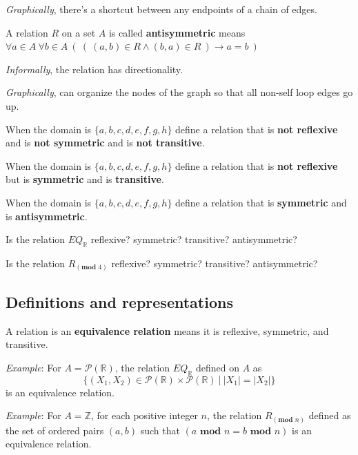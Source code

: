 \documentclass[12pt, oneside]{article}
\begin{document}
{\it Graphically}, there's a shortcut between any endpoints of a chain of 
edges. \vfill


A relation $R$ on a set $A$ is called {\bf antisymmetric} means 
$\forall a \in A ~\forall b \in A~\left(~\left( ~(a,b) \in R \land (b,a) \in R ~\right) \to a=b~\right)$
 

{\it Informally}, the relation has directionality.

{\it Graphically}, can organize the nodes of the graph so that 
all non-self loop edges go up. \vfill
\newpage



When the domain is $\{ a,b,c,d,e,f,g,h\}$ define a relation that is {\bf not reflexive} and 
is {\bf not symmetric} and is {\bf not transitive}.

\vfill

When the domain is $\{ a,b,c,d,e,f,g,h\}$ define a relation that is {\bf not reflexive} but 
is {\bf symmetric} and is {\bf transitive}.

\vfill

When the domain is $\{ a,b,c,d,e,f,g,h\}$ define a relation that is {\bf symmetric} and
is {\bf antisymmetric}.

\vfill

Is the relation $EQ_{\mathbb{R}}$ reflexive? symmetric? transitive? antisymmetric?

\vfill

Is the relation $R_{(\textbf{mod } 4)}$ reflexive? symmetric? transitive? antisymmetric?

\vfill
%
 \vfill

\newpage
\subsection*{Definitions and representations}


A relation is an {\bf equivalence relation} means it is reflexive, symmetric, and transitive. 


{\it Example}: For $A = \mathcal{P}(\mathbb{R})$, the relation $EQ_{\mathbb{R}}$ defined on $A$ as 
\[
\{ (X_1, X_2 ) \in\mathcal{P}(\mathbb{R})  \times \mathcal{P}(\mathbb{R}) ~|~ |X_1| = |X_2| \}
\]
is an equivalence relation.

\vfill

{\it Example}: For $A = \mathbb{Z}$, for each positive integer $n$, the relation $R_{(\textbf{mod } n)}$ defined as the set of ordered pairs $(a, b)$ such that $(a \textbf{ mod } n = b \textbf{ mod } n)$ is an equivalence relation.
\vfill 
\end{document}
